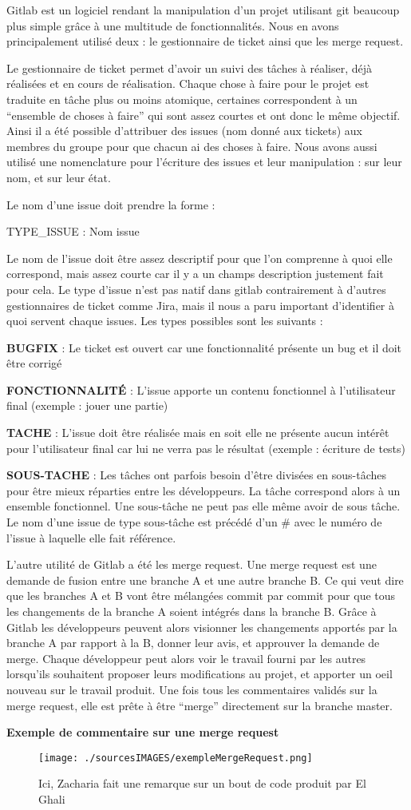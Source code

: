 \hspace{3em}
Gitlab est un logiciel rendant la manipulation d’un projet utilisant git beaucoup plus simple grâce à une multitude de fonctionnalités. Nous en avons principalement utilisé deux : le gestionnaire de ticket ainsi que les merge request.

	Le gestionnaire de ticket permet d’avoir un suivi des tâches à réaliser, déjà réalisées et en cours de réalisation. Chaque chose à faire pour le projet est traduite en tâche plus ou moins atomique, certaines correspondent à un “ensemble de choses à faire” qui sont assez courtes et ont donc le même objectif. Ainsi il a été possible d’attribuer des issues (nom donné aux tickets) aux membres du groupe pour que chacun ai des choses à faire. Nous avons aussi utilisé une nomenclature pour l’écriture des issues et leur manipulation : sur leur nom, et sur leur état.

	Le nom d’une issue doit prendre la forme :

	TYPE\_ISSUE : Nom issue

Le nom de l’issue doit être assez descriptif pour que l’on comprenne à quoi elle correspond, mais assez courte car il y a un champs description justement fait pour cela.
Le type d’issue n’est pas natif dans gitlab contrairement à d’autres gestionnaires de ticket comme Jira, mais il nous a paru important d’identifier à quoi servent chaque issues.
Les types possibles sont les suivants :

\textbf{BUGFIX} : Le ticket est ouvert car une fonctionnalité présente un bug et il doit être corrigé

\textbf{FONCTIONNALITÉ} : L’issue apporte un contenu fonctionnel à l’utilisateur final (exemple : jouer une partie)

\textbf{TACHE} : L’issue doit être réalisée mais en soit elle ne présente aucun intérêt pour l’utilisateur final car lui ne verra pas le résultat (exemple : écriture de tests)

\textbf{SOUS-TACHE} : Les tâches ont parfois besoin d’être divisées en sous-tâches pour être mieux réparties entre les développeurs. La tâche correspond alors à un ensemble fonctionnel. Une sous-tâche ne peut pas elle même avoir de sous tâche. Le nom d’une issue de type sous-tâche est précédé d’un \# avec le numéro de l’issue à laquelle elle fait référence.

	L’autre utilité de Gitlab a été les merge request. Une merge request est une demande de fusion entre une branche A et une autre branche B. Ce qui veut dire que les branches A et B vont être mélangées commit par commit pour que tous les changements de la branche A soient intégrés dans la branche B.
Grâce à Gitlab les développeurs peuvent alors visionner les changements apportés par la branche A par rapport à la B, donner leur avis, et approuver la demande de merge.
Chaque développeur peut alors voir le travail fourni par les autres lorsqu’ils souhaitent proposer leurs modifications au projet, et apporter un oeil nouveau sur le travail produit. Une fois tous les commentaires validés sur la merge request, elle est prête à être “merge” directement sur la branche master.

\begin{center}
\textbf{Exemple de commentaire sur une merge request}
\end{center}
\begin{figure}[h]
  \texttt{[image: ./sourcesIMAGES/exempleMergeRequest.png]}
  \caption{Ici, Zacharia fait une remarque sur un bout de code produit par El Ghali}
\end{figure}
